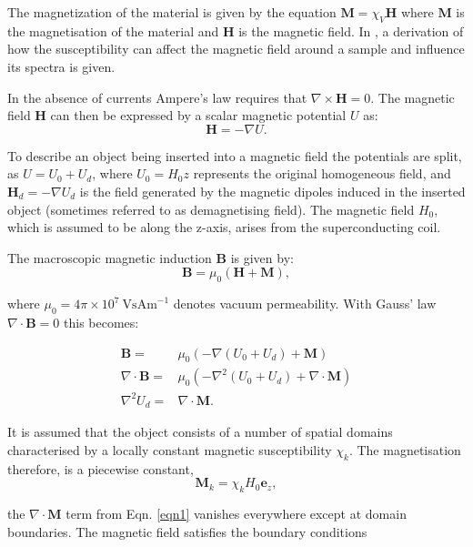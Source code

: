 The magnetization of the material is given by the equation $\mathbf{M} = \chi_V \mathbf{H}$
where $\mathbf{M}$ is the magnetisation of the material and $\mathbf{H}$ is the magnetic field. In
\citep{RN118}, a derivation of how the susceptibility can affect the magnetic field around a sample
and influence its spectra is given.

In the absence of currents Ampere’s law requires that $\nabla \times \mathbf{H} = 0$. The magnetic field $\mathbf{H}$
can then be expressed by a scalar magnetic potential $U$ as:
\begin{equation}
\mathbf{H} = -\nabla U.
\end{equation}

To describe an object being inserted into a magnetic field the potentials are split, as
$U = U_{0}  + U_{d}$, where $U_{0} = H_{0}z$ represents the original homogeneous field, and
$\mathbf{H}_d = - \nabla U_{d}$ is the field generated by the magnetic dipoles induced in the
inserted object (sometimes referred to as demagnetising field). The magnetic field $H_{0}$,
which is assumed to be along the z-axis, arises from the superconducting coil.

 The macroscopic magnetic induction $\mathbf{B}$ is given by:
\begin{equation}
  \mathbf{B} = \mu_{0}(\mathbf{H}+\mathbf{M}),
\end{equation}

where $\mu_{0} = 4\pi\times10^{7}~\text{VsAm}^{-1}$ denotes vacuum permeability. With Gauss' law $\nabla \cdot \mathbf{B} = 0$ this becomes:

\begin{align}\label{eqn1}
  \mathbf{B} =& \mu_0(-\nabla(U_0 + U_d) + \mathbf{M})\\
  \nabla\cdot\mathbf{B} =& \mu_0(-\nabla^{2}(U_0 + U_d) + \nabla\cdot\mathbf{M})\\
  \nabla^{2}U_{d} =& \nabla \cdot \mathbf{M}.
\end{align}

It is assumed that the object consists of a number of spatial domains characterised by a
locally constant magnetic susceptibility $\chi_{k}$. The magnetisation therefore, is a piecewise
constant,
\begin{equation}
  \mathbf{M}_{k} = \chi_{k}H_{0}\mathbf{e}_{z},
\end{equation}

the $\nabla\cdot\mathbf{M}$ term from Eqn. \ref{eqn1} vanishes everywhere except at domain boundaries. The magnetic
field satisfies the boundary conditions\citep{Jackson:2007uq}

